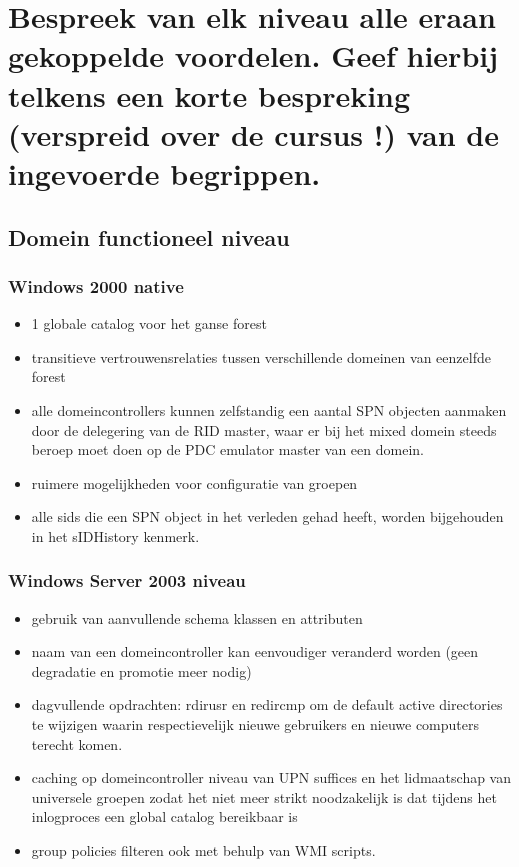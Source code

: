 \section{Bespreek van elk niveau alle eraan gekoppelde voordelen. Geef hierbij telkens een korte bespreking (verspreid over de cursus !) van de ingevoerde begrippen.}

\subsection{Domein functioneel niveau}
\subsubsection{Windows 2000 native}
\begin{itemize}
\item 1 globale catalog voor het ganse forest
\item transitieve vertrouwensrelaties tussen verschillende domeinen van eenzelfde forest
\item alle domeincontrollers kunnen zelfstandig een aantal SPN objecten aanmaken door de delegering van de RID master, waar er bij het mixed domein steeds beroep moet doen op de PDC emulator master van een domein.
\item ruimere mogelijkheden voor configuratie van groepen
\item alle sids die een SPN object in het verleden gehad heeft, worden bijgehouden in het sIDHistory kenmerk.
\end{itemize}
\clearpage
\subsubsection{Windows Server 2003 niveau}
\begin{itemize}
\item gebruik van aanvullende schema klassen en attributen 
\item naam van een domeincontroller kan eenvoudiger veranderd worden (geen degradatie en promotie meer nodig)
\item dagvullende opdrachten: rdirusr en redircmp om de default active directories te wijzigen waarin respectievelijk nieuwe gebruikers en nieuwe computers terecht komen.
\item caching op domeincontroller niveau van UPN suffices en het lidmaatschap van universele groepen zodat het niet meer strikt noodzakelijk is dat tijdens het inlogproces een global catalog bereikbaar is
\item group policies filteren ook met behulp van WMI scripts.
\end{itemize}

